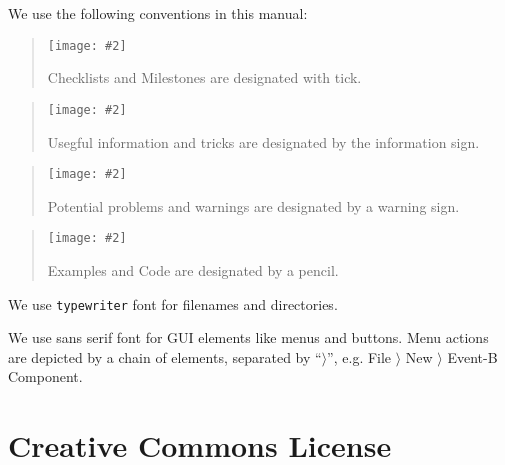 \documentclass{book}
\def\doculist#1#2{
\begin{quote}
\hspace{-10mm}
\textrm{\texttt{[image: \#2]}} %
\vspace{-8mm}

#1
\end{quote}
}
\def\tick#1{\doculist{#1}{img/tick_64.png}}
\def\info#1{\doculist{#1}{img/info_64.png}}
\def\warning#1{\doculist{#1}{img/warning_64.png}}
\def\pencil#1{\doculist{#1}{img/pencil_64.png}}
\begin{document}
We use the following conventions in this manual:

\tick{Checklists and Milestones are designated with tick.}
\info{Usegful information and tricks are designated by the information sign.}
\warning{Potential problems and warnings are designated by a warning sign.}
\pencil{Examples and Code are designated by a pencil.}

We use \texttt{typewriter} font for filenames and directories.

We use \textsf{sans serif font} for GUI elements like menus and buttons.  Menu actions are depicted by a chain of elements, separated by ``$\rangle$'', e.g. \textsf{File $\rangle$ New $\rangle$ Event-B Component}.


\section{Creative Commons License}








\end{document}
